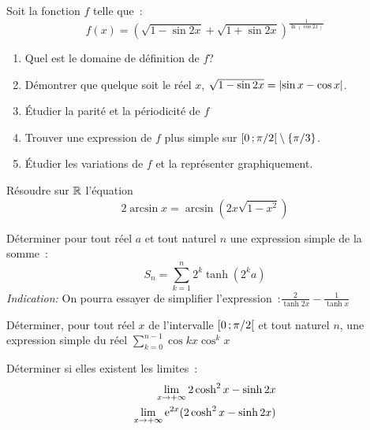 \begin{exercice}
  Soit la fonction \(f\) telle que~:
  \begin{equation}
    f(x) = {(\sqrt{1-\sin 2x}+\sqrt{1+\sin 2x})}^{\frac{1}{\ln(\cos 2x)}}
  \end{equation}
  \begin{enumerate}
    \item Quel est le domaine de définition de \(f\)?
    \item Démontrer que quelque soit le réel \(x\), \(\sqrt{1-\sin 2x} = 
      \left\lvert\sin x - \cos x\right\rvert\).
    \item Étudier la parité et la périodicité de \(f\)
    \item Trouver une expression de \(f\) plus simple sur 
      \(\left[ 0 \, ; {} \pi/2 \right[\setminus\{\pi/3\}\).
    \item Étudier les variations de \(f\) et la représenter graphiquement.
  \end{enumerate}
\end{exercice}

\begin{exercice}
  Résoudre sur \(\mathbb{R}\) l'équation
  \begin{equation}
    2\arcsin x = \arcsin(2x\sqrt{1-x^2})
  \end{equation}
\end{exercice}

\begin{exercice}
  Déterminer pour tout réel \(a\) et tout naturel \(n\) une expression simple 
  de la somme~:
  \begin{equation}
    S_n = \sum_{k = 1}^n 2^k \tanh(2^k a)
  \end{equation}
  \emph{Indication:} On pourra essayer de simplifier 
  l'expression~:\(\frac{2}{\tanh 2x} - \frac{1}{\tanh x}\)
\end{exercice}

\begin{exercice}
  Déterminer, pour tout réel \(x\) de l'intervalle \(\left[ 0 \, ; {} \pi/2 \right[\) 
  et tout naturel \(n\), une expression simple du réel \(\sum_{k = 0}^{n - 
  1}{\cos kx}{\cos^k x}\)
\end{exercice}

\begin{exercice}
  Déterminer si elles existent les limites~:
  \begin{align*}
    \lim\limits_{x \to +\infty} 2\cosh^2x-\sinh 2x \\
    \lim\limits_{x \to +\infty} \operatorname{e}^{2x}(2\cosh^2x-\sinh 2x)
  \end{align*}
\end{exercice}

